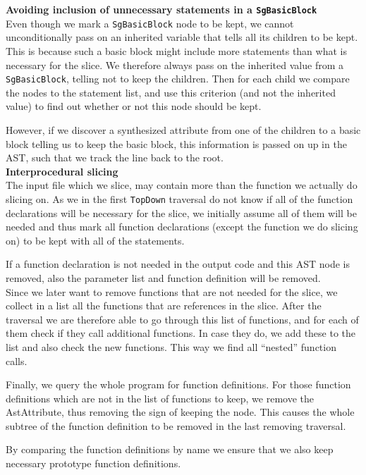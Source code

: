 \documentclass[11pt,a4paper,twoside]{article}
\begin{document}
\noindent
\textbf{Avoiding inclusion of unnecessary statements in a \texttt{SgBasicBlock}}\\
Even though we mark a \texttt{SgBasicBlock} node to be kept, we cannot unconditionally pass on an inherited variable that tells all its children to be kept. This is because such a basic block might include more statements than what is necessary for the slice. We therefore always pass on the inherited value from a \texttt{SgBasicBlock}, telling not to keep the children. Then for each child we compare the nodes to the statement list, and use this criterion (and not the inherited value) to find out whether or not this node should be kept.

However, if we discover a synthesized attribute from one of the children to a basic block telling us to keep the basic block, this information is passed on up in the AST, such that we track the line back to the root.\\

\noindent
\textbf{Interprocedural slicing}\\
The input file which we slice, may contain more than the function we actually do slicing on. As we in the first \texttt{TopDown} traversal do not know if all of the function declarations will be necessary for the slice, we initially assume all of them will be needed and thus mark all function declarations (except the function we do slicing on) to be kept with all of the statements.

If a function declaration is not needed in the output code and this AST node is removed, also the parameter list and function definition will be removed.\\

Since we later want to remove functions that are not needed for the slice, we collect in a list all the functions that are references in the slice. After the traversal we are therefore able to go through this list of functions, and for each of them check if they call additional functions. In case they do, we add these to the list and also check the new functions. This way we find all ``nested'' function calls.

Finally, we query the whole program for function definitions. For those function definitions which are not in the list of functions to keep, we remove the AstAttribute, thus removing the sign of keeping the node. This causes the whole subtree of the function definition to be removed in the last removing traversal.

By comparing the function definitions by name we ensure that we also keep necessary prototype function definitions.\\
\end{document}
